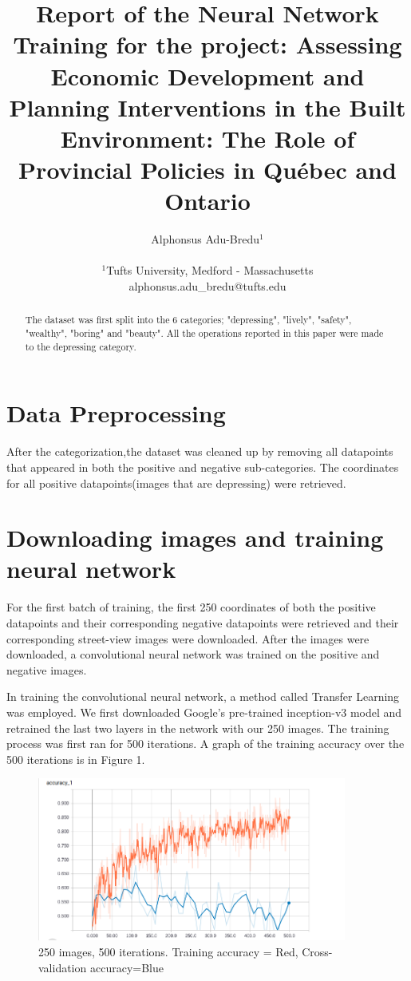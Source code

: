 \documentclass[letterpaper]{article}
\title{Report of the Neural Network Training for the project: Assessing Economic Development and Planning Interventions in the Built Environment: The Role of Provincial Policies in Québec and Ontario}
\author{Alphonsus Adu-Bredu$^{1}$ \\
\mbox{}\\
$^1$Tufts University, Medford - Massachusetts \\
alphonsus.adu\_bredu@tufts.edu}
\begin{document}
\maketitle

\begin{abstract}
	The dataset was first split into the 6 categories; "depressing", "lively", "safety", "wealthy", "boring" and "beauty". All the operations reported in this paper were made to the depressing category.
\end{abstract}
\section{Data Preprocessing}
After the categorization,the dataset was cleaned up by removing all datapoints that appeared in both the positive and negative sub-categories. The coordinates for all positive datapoints(images that are depressing) were retrieved. 

\section{Downloading images and training neural network}
For the first batch of training, the first 250 coordinates of both the positive datapoints and their corresponding negative datapoints were retrieved and their corresponding street-view images were downloaded. After the images were downloaded, a convolutional neural network was trained on the positive and negative images. 

In training the convolutional neural network, a method called Transfer Learning was employed. We first downloaded Google's pre-trained inception-v3 model and retrained the last two layers in the network with our 250 images. The training process was first ran for 500 iterations. A graph of the training accuracy over the 500 iterations is in Figure 1.

\begin{figure}[!htb]
	\begin{center}
		\includegraphics[width=4in]{250_img_500_it_accuracy.png}
		\caption{250 images, 500 iterations. Training accuracy = Red, Cross-validation accuracy=Blue}
		\label{fig1}
	\end{center}
\end{figure}
\end{document}
